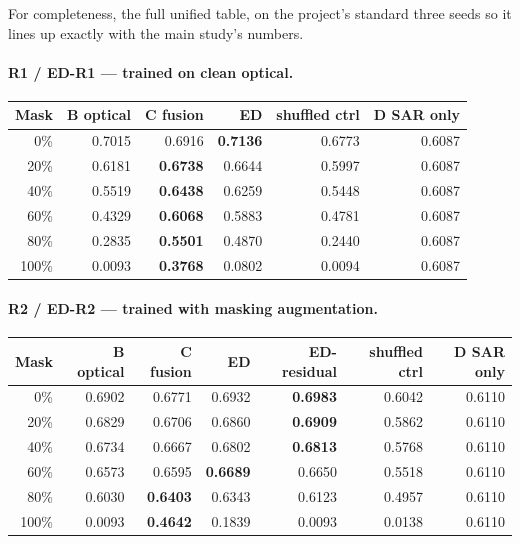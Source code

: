 \documentclass[11pt,a4paper]{report}
\begin{document}
For completeness, the full unified table, on the project's standard three seeds
so it lines up exactly with the main study's numbers.

\paragraph{R1 / ED-R1 --- trained on clean optical.}
\begin{center}
\scriptsize
\begin{tabular}{@{}rrrrrr@{}}
\toprule
\textbf{Mask} & \textbf{B optical} & \textbf{C fusion} & \textbf{ED} &
\textbf{shuffled ctrl} & \textbf{D SAR only} \\
\midrule
0\%   & 0.7015 & 0.6916 & \textbf{0.7136} & 0.6773 & 0.6087 \\
20\%  & 0.6181 & \textbf{0.6738} & 0.6644 & 0.5997 & 0.6087 \\
40\%  & 0.5519 & \textbf{0.6438} & 0.6259 & 0.5448 & 0.6087 \\
60\%  & 0.4329 & \textbf{0.6068} & 0.5883 & 0.4781 & 0.6087 \\
80\%  & 0.2835 & \textbf{0.5501} & 0.4870 & 0.2440 & 0.6087 \\
100\% & 0.0093 & \textbf{0.3768} & 0.0802 & 0.0094 & 0.6087 \\
\bottomrule
\end{tabular}
\end{center}

\paragraph{R2 / ED-R2 --- trained with masking augmentation.}
\begin{center}
\scriptsize
\begin{tabular}{@{}rrrrrrr@{}}
\toprule
\textbf{Mask} & \textbf{B optical} & \textbf{C fusion} & \textbf{ED} &
\textbf{ED-residual} & \textbf{shuffled ctrl} & \textbf{D SAR only} \\
\midrule
0\%   & 0.6902 & 0.6771 & 0.6932 & \textbf{0.6983} & 0.6042 & 0.6110 \\
20\%  & 0.6829 & 0.6706 & 0.6860 & \textbf{0.6909} & 0.5862 & 0.6110 \\
40\%  & 0.6734 & 0.6667 & 0.6802 & \textbf{0.6813} & 0.5768 & 0.6110 \\
60\%  & 0.6573 & 0.6595 & \textbf{0.6689} & 0.6650 & 0.5518 & 0.6110 \\
80\%  & 0.6030 & \textbf{0.6403} & 0.6343 & 0.6123 & 0.4957 & 0.6110 \\
100\% & 0.0093 & \textbf{0.4642} & 0.1839 & 0.0093 & 0.0138 & 0.6110 \\
\bottomrule
\end{tabular}
\end{center}
\end{document}
